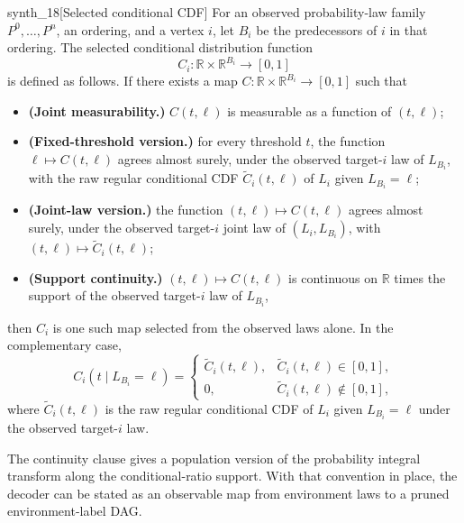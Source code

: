 \begin{definitionv}{synth_18}[Selected conditional CDF]
For an observed probability-law family \(P^0,\ldots,P^n\), an ordering, and a vertex \(i\), let \(B_i\) be the predecessors of \(i\) in that ordering. The selected conditional distribution function
\[
C_i:\mathbb R\times\mathbb R^{B_i}\to[0,1]
\]
is defined as follows. If there exists a map \(C:\mathbb R\times\mathbb R^{B_i}\to[0,1]\) such that
\begin{itemize}
\item \textbf{(Joint measurability.)} \(C(t,\ell)\) is measurable as a function of \((t,\ell)\);
\item \textbf{(Fixed-threshold version.)} for every threshold \(t\), the function \(\ell\mapsto C(t,\ell)\) agrees almost surely, under the observed target-\(i\) law of \(L_{B_i}\), with the raw regular conditional CDF \(\widetilde C_i(t,\ell)\) of \(L_i\) given \(L_{B_i}=\ell\);
\item \textbf{(Joint-law version.)} the function \((t,\ell)\mapsto C(t,\ell)\) agrees almost surely, under the observed target-\(i\) joint law of \((L_i,L_{B_i})\), with \((t,\ell)\mapsto\widetilde C_i(t,\ell)\);
\item \textbf{(Support continuity.)} \((t,\ell)\mapsto C(t,\ell)\) is continuous on \(\mathbb R\) times the support of the observed target-\(i\) law of \(L_{B_i}\),
\end{itemize}
then \(C_i\) is one such map selected from the observed laws alone. In the complementary case,
\[
C_i(t\mid L_{B_i}=\ell)=
\begin{cases}
\widetilde C_i(t,\ell), & \widetilde C_i(t,\ell)\in[0,1],\\
0, & \widetilde C_i(t,\ell)\notin[0,1],
\end{cases}
\]
where \(\widetilde C_i(t,\ell)\) is the raw regular conditional CDF of \(L_i\) given \(L_{B_i}=\ell\) under the observed target-\(i\) law.
\end{definitionv}

The continuity clause gives a population version of the probability integral transform along the conditional-ratio support. With that convention in place, the decoder  can be stated as an observable map from environment laws to a pruned environment-label DAG.


